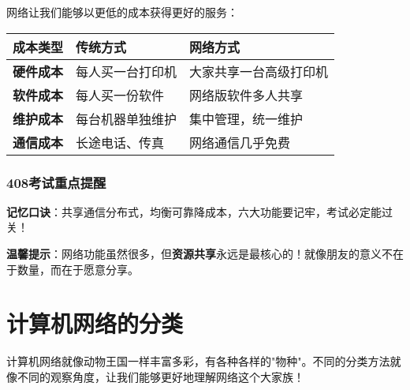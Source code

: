 \documentclass[lang=cn,newtx,10pt,scheme=chinese]{../../elegantbook}
\begin{document}
网络让我们能够以更低的成本获得更好的服务：

\begin{longtable}{|p{4cm}|p{4cm}|p{5cm}|}
\hline
\textbf{成本类型} & \textbf{传统方式} & \textbf{网络方式} \\
\hline
\textbf{硬件成本} & 每人买一台打印机 & 大家共享一台高级打印机 \\
\hline
\textbf{软件成本} & 每人买一份软件 & 网络版软件多人共享 \\
\hline
\textbf{维护成本} & 每台机器单独维护 & 集中管理，统一维护 \\
\hline
\textbf{通信成本} & 长途电话、传真 & 网络通信几乎免费 \\
\hline
\end{longtable}

\subsubsection{408考试重点提醒}

\begin{center}
\end{center}

\textbf{记忆口诀}：共享通信分布式，均衡可靠降成本，六大功能要记牢，考试必定能过关！

\textbf{温馨提示}：网络功能虽然很多，但\textbf{资源共享}永远是最核心的！就像朋友的意义不在于数量，而在于愿意分享。

\section{计算机网络的分类}
计算机网络就像动物王国一样丰富多彩，有各种各样的"物种"。不同的分类方法就像不同的观察角度，让我们能够更好地理解网络这个大家族！
\end{document}
